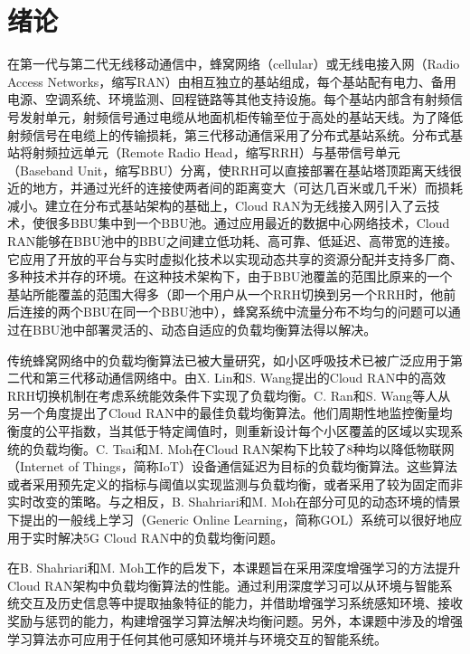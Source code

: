 
\chapter{绪论}
\label{chap:Intro}
在第一代与第二代无线移动通信中，蜂窝网络（cellular）或无线电接入网（Radio Access Networks，缩写RAN）由相互独立的基站组成，每个基站配有电力、备用电源、空调系统、环境监测、回程链路等其他支持设施。每个基站内部含有射频信号发射单元，射频信号通过电缆从地面机柜传输至位于高处的基站天线。为了降低射频信号在电缆上的传输损耗，第三代移动通信采用了分布式基站系统。分布式基站将射频拉远单元（Remote Radio Head，缩写RRH）与基带信号单元（Baseband Unit，缩写BBU）分离，使RRH可以直接部署在基站塔顶距离天线很近的地方，并通过光纤的连接使两者间的距离变大（可达几百米或几千米）而损耗减小。建立在分布式基站架构的基础上，Cloud RAN为无线接入网引入了云技术，使很多BBU集中到一个BBU池。通过应用最近的数据中心网络技术，Cloud RAN能够在BBU池中的BBU之间建立低功耗、高可靠、低延迟、高带宽的连接。它应用了开放的平台与实时虚拟化技术以实现动态共享的资源分配并支持多厂商、多种技术并存的环境。在这种技术架构下，由于BBU池覆盖的范围比原来的一个基站所能覆盖的范围大得多（即一个用户从一个RRH切换到另一个RRH时，他前后连接的两个BBU在同一个BBU池中）\cite{ran2015optimal}，蜂窝系统中流量分布不均匀的问题可以通过在BBU池中部署灵活的、动态自适应的负载均衡算法得以解决。

传统蜂窝网络中的负载均衡算法已被大量研究，如小区呼吸技术\cite{niu2010cell}已被广泛应用于第二代和第三代移动通信网络中。由X. Lin和S. Wang提出的Cloud RAN中的高效RRH切换机制在考虑系统能效条件下实现了负载均衡\cite{lin2010efficient}。C. Ran和S. Wang等人\cite{ran2015optimal}从另一个角度提出了Cloud RAN中的最佳负载均衡算法。他们周期性地监控衡量均衡度的公平指数，当其低于特定阈值时，则重新设计每个小区覆盖的区域以实现系统的负载均衡。C. Tsai和M. Moh在Cloud RAN架构下比较了8种均以降低物联网（Internet of Things，简称IoT）设备通信延迟为目标的负载均衡算法。这些算法或者采用预先定义的指标与阈值以实现监测与负载均衡，或者采用了较为固定而非实时改变的策略。与之相反，B. Shahriari和M. Moh在部分可见的动态环境的情景下提出的一般线上学习（Generic Online Learning，简称GOL）系统可以很好地应用于实时解决5G Cloud RAN中的负载均衡问题。

在B. Shahriari和M. Moh工作的启发下，本课题旨在采用深度增强学习的方法提升Cloud RAN架构中负载均衡算法的性能。通过利用深度学习可以从环境与智能系统交互及历史信息等中提取抽象特征的能力，并借助增强学习系统感知环境、接收奖励与惩罚的能力，构建增强学习算法解决均衡问题。另外，本课题中涉及的增强学习算法亦可应用于任何其他可感知环境并与环境交互的智能系统。